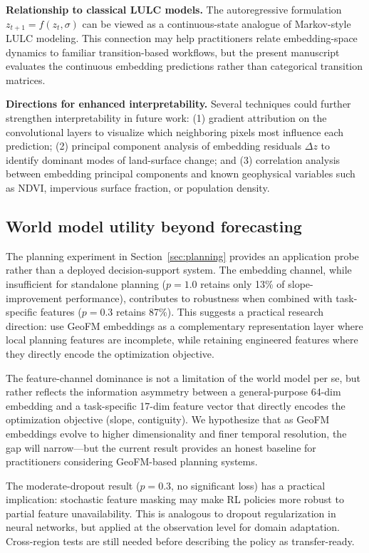 \documentclass{article}
\begin{document}
\textbf{Relationship to classical LULC models.}
The autoregressive formulation $z_{t+1} = f(z_t, \sigma)$ can be viewed as a continuous-state analogue of Markov-style LULC modeling. This connection may help practitioners relate embedding-space dynamics to familiar transition-based workflows, but the present manuscript evaluates the continuous embedding predictions rather than categorical transition matrices.

\textbf{Directions for enhanced interpretability.}
Several techniques could further strengthen interpretability in future work: (1) gradient attribution on the convolutional layers to visualize which neighboring pixels most influence each prediction; (2) principal component analysis of embedding residuals $\Delta z$ to identify dominant modes of land-surface change; and (3) correlation analysis between embedding principal components and known geophysical variables such as NDVI, impervious surface fraction, or population density.

\subsection{World model utility beyond forecasting}

The planning experiment in Section~\ref{sec:planning} provides an application probe rather than a deployed decision-support system. The embedding channel, while insufficient for standalone planning ($p=1.0$ retains only 13\% of slope-improvement performance), contributes to robustness when combined with task-specific features ($p=0.3$ retains 87\%). This suggests a practical research direction: use GeoFM embeddings as a complementary representation layer where local planning features are incomplete, while retaining engineered features where they directly encode the optimization objective.

The feature-channel dominance is not a limitation of the world model per se, but rather reflects the information asymmetry between a general-purpose 64-dim embedding and a task-specific 17-dim feature vector that directly encodes the optimization objective (slope, contiguity). We hypothesize that as GeoFM embeddings evolve to higher dimensionality and finer temporal resolution, the gap will narrow---but the current result provides an honest baseline for practitioners considering GeoFM-based planning systems.

The moderate-dropout result ($p=0.3$, no significant loss) has a practical implication: stochastic feature masking may make RL policies more robust to partial feature unavailability. This is analogous to dropout regularization in neural networks, but applied at the observation level for domain adaptation. Cross-region tests are still needed before describing the policy as transfer-ready.
\end{document}
